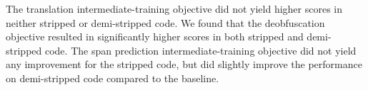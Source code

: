 The translation intermediate-training objective did not yield higher scores in neither stripped or demi-stripped code. We found that the deobfuscation objective resulted in significantly higher scores in both stripped and demi-stripped code. The span prediction intermediate-training objective did not yield any improvement for the stripped code, but did slightly improve the performance on demi-stripped code compared to the baseline.